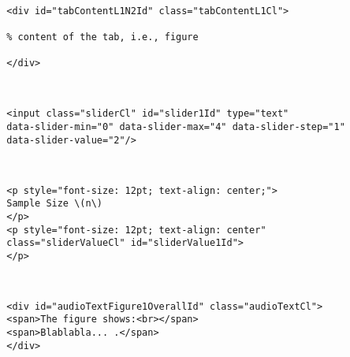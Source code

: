 \documentclass[12pt]{article}
\begin{document}
\begin{CodeSnippet}[!hp]
	\centering
	\caption{\emph{Html} code snippet for integration of tab 1}
	\footnotesize
	\vspace{0.25cm}
	\begin{BVerbatim}
		
		<div id="tabContentL1N2Id" class="tabContentL1Cl">
		
		
		</div>
		
	\end{BVerbatim}
	\label{HtmlCodSniDivTabTag}
\end{CodeSnippet}

\begin{CodeSnippet}[!hp]
	\centering
	\caption{\emph{Html} code snippet for the integration of slider 1}
	\footnotesize
	\vspace{0.25cm}
	\begin{BVerbatim}
		
		<input class="sliderCl" id="slider1Id" type="text"
		data-slider-min="0" data-slider-max="4" data-slider-step="1"
		data-slider-value="2"/>
		
	\end{BVerbatim}
	\label{HtmlCodSniInputTag}
\end{CodeSnippet}

\begin{CodeSnippet}[!hp]
	\centering
	\caption{\emph{Html} code snippet to display the value of slider 1}
	\footnotesize
	\vspace{0.25cm}
	\begin{BVerbatim}
		
		<p style="font-size: 12pt; text-align: center;">
		Sample Size \(n\)
		</p>
		<p style="font-size: 12pt; text-align: center"
		class="sliderValueCl" id="sliderValue1Id">
		</p>
		
	\end{BVerbatim}
	\label{HtmlCodSniPSliderValueTag}
\end{CodeSnippet}

\begin{CodeSnippet}[!hp]
	\centering
	\caption{\emph{Html} code snippet for adding an overall explanation of figure 1}
	\footnotesize
	\vspace{0.25cm}
	\begin{BVerbatim}
		
		<div id="audioTextFigure1OverallId" class="audioTextCl">
		<span>The figure shows:<br></span>
		<span>Blablabla... .</span>
		</div>
		
	\end{BVerbatim}
	\label{HtmlCodSnipDivOverallExplainText}
\end{CodeSnippet}
\end{document}
